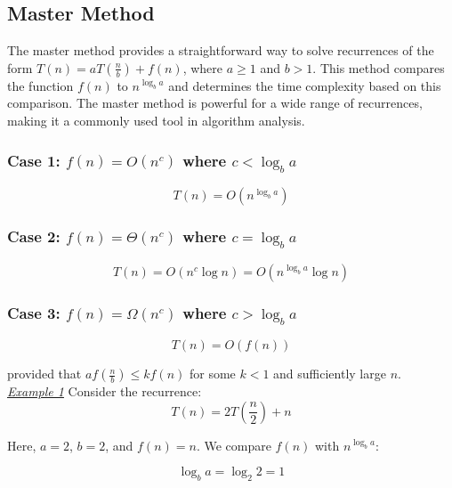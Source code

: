 \documentclass[a4paper,10pt]{article}
\newcommand{\hlt}[1]{\colorbox{color3}{#1}}
\begin{document}
\subsection{Master Method}

The master method provides a straightforward way to solve recurrences of the form $T(n) = aT\left(\frac{n}{b}\right) + f(n)$, where $a \geq 1$ and $b > 1$. This method compares the function $f(n)$ to $n^{\log_b a}$ and determines the time complexity based on this \hlt{comparison}. The master method is powerful for a wide range of recurrences, making it a commonly used tool in algorithm analysis.

\subsubsection*{Case 1: \(f(n) = O(n^c)\) where \(c < \log_b{a}\)}
\begin{equation}
    T(n) = O(n^{\log_b{a}})
\end{equation}

\subsubsection*{Case 2: \(f(n) = \Theta(n^c)\) where \(c = \log_b{a}\)}
\begin{equation}
    T(n) = O(n^c \log{n}) = O(n^{\log_b{a}} \log{n})
\end{equation}

\subsubsection*{Case 3: \(f(n) = \Omega(n^c)\) where \(c > \log_b{a}\)}
\begin{equation}
    T(n) = O(f(n))
\end{equation}

provided that \(af\left(\frac{n}{b}\right) \leq kf(n)\) for some \(k < 1\) and sufficiently large \(n\).\\

\noindent
\textit{\underline{Example 1}}
Consider the recurrence:
\begin{equation}
    T(n) = 2T\left(\frac{n}{2}\right) + n
\end{equation}

Here, \(a = 2\), \(b = 2\), and \(f(n) = n\). We compare \(f(n)\) with \(n^{\log_b{a}}\):

\begin{equation}
    \log_b{a} = \log_2{2} = 1
\end{equation}
\end{document}
